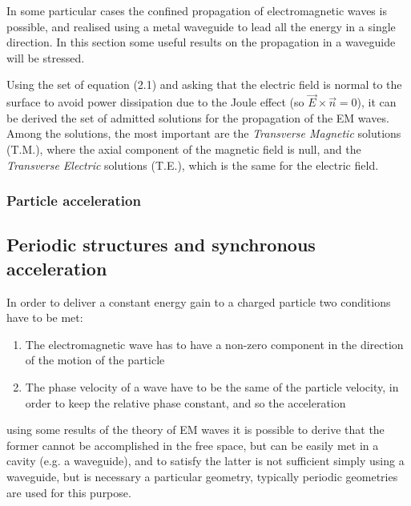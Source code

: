 In some particular cases the confined propagation of electromagnetic waves is possible, and realised using a metal waveguide to lead all the energy in a single direction. In this section some useful results on the propagation in a waveguide will be stressed. 


Using the set of equation (2.1) and asking that the electric field is normal to the surface to avoid power dissipation due to the Joule effect (so $\vec{E} \times \vec{n} = 0$), it can be derived the set of admitted solutions for the propagation of the EM waves. Among the solutions, the most important are the \textit{Transverse Magnetic} solutions (T.M.), where the axial component of the magnetic field is null, and the \textit{Transverse Electric} solutions (T.E.), which is the same for the electric field.




\subsubsection[Particle acceleration]{Particle acceleration}

\cite{Kilpatrick:slides}



\subsection[Periodic structures and synchronous acceleration]{Periodic structures and synchronous acceleration}

In order to deliver a  constant energy gain to a charged particle two conditions have to be met:

\begin{enumerate}
\item The electromagnetic wave has to have a non-zero component in the direction of the motion of the particle
\item The phase velocity of a wave have to be the same of the particle velocity, in order to keep the relative phase constant, and so the acceleration
\end{enumerate}
using some results of the theory of EM waves it is possible to derive that the former cannot be accomplished in the free space, but can be easily met in a cavity (e.g. a waveguide), and to satisfy the latter is not sufficient simply using a waveguide, but is necessary a particular geometry, typically periodic geometries are used for this purpose.







